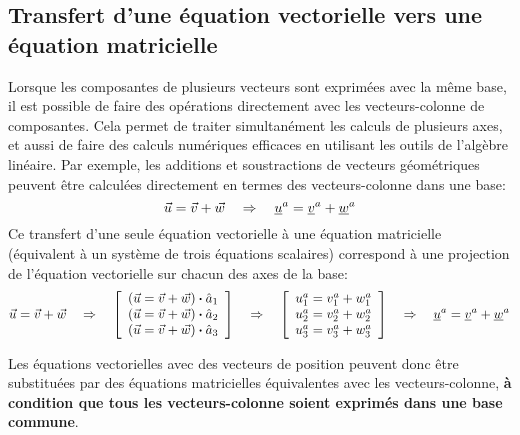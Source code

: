 \subsection{Transfert d'une équation vectorielle vers une équation matricielle}
%
Lorsque les composantes de plusieurs vecteurs sont exprimées avec la même base, il est possible de faire des opérations directement avec les vecteurs-colonne de composantes. Cela permet de traiter simultanément les calculs de plusieurs axes, et aussi de faire des calculs numériques efficaces en utilisant les outils de l'algèbre linéaire. Par exemple, les additions et soustractions de vecteurs géométriques peuvent être calculées directement en termes des vecteurs-colonne dans une base:
\begin{equation}
 \vec{u}   = \vec{v} + \vec{w}   \quad \Rightarrow \quad
 \underline{u}^a = \underline{v}^a + \underline{w}^a
\end{equation}
Ce transfert d'une seule équation vectorielle à une équation matricielle (équivalent à un système de trois équations scalaires) correspond à une projection de l'équation vectorielle sur chacun des axes de la base:
\begin{equation}
 \vec{u}   = \vec{v} + \vec{w}
 \quad \Rightarrow \quad
 \left[ \begin{array}{c} (\vec{u}   = \vec{v} + \vec{w}  ) \boldsymbol{\cdot} \hat{a}_1 \\ (\vec{u}   = \vec{v} + \vec{w}  ) \boldsymbol{\cdot} \hat{a}_2 \\ (\vec{u}   = \vec{v} + \vec{w}  ) \boldsymbol{\cdot} \hat{a}_3  \end{array} \right]
 \quad \Rightarrow \quad
 \left[ \begin{array}{c}  u_1^a   = v_1^a + w_1^a   \\  u_2^a   = v_2^a + w_2^a   \\ u_3^a   = v_3^a + w_3^a   \end{array} \right]
 \quad \Rightarrow \quad
 \underline{u}^a = \underline{v}^a + \underline{w}^a
\end{equation}

Les équations vectorielles avec des vecteurs de position peuvent donc être substituées par des équations matricielles équivalentes avec les vecteurs-colonne,\textbf{ à condition que tous les vecteurs-colonne soient exprimés dans une base commune}.

